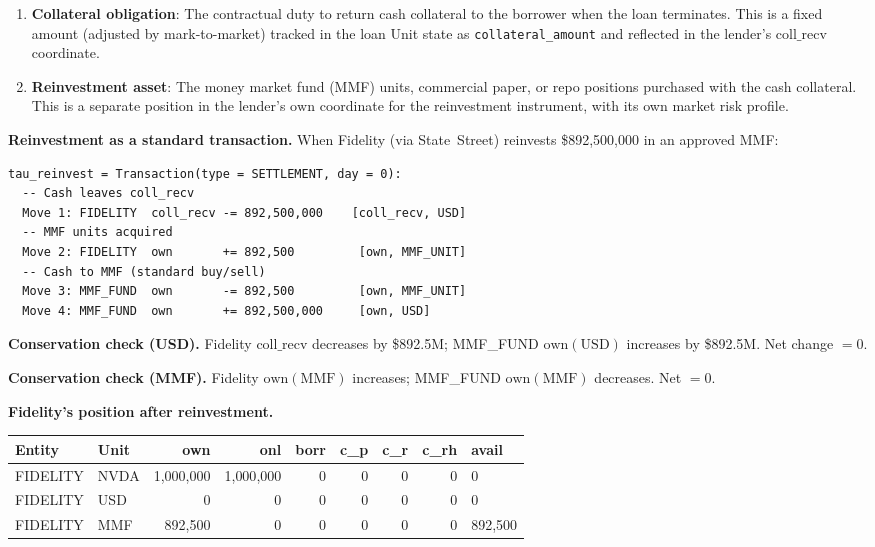\documentclass[11pt,a4paper]{article}
\begin{document}
\begin{enumerate}[nosep]
\item \textbf{Collateral obligation}: The contractual duty to return cash collateral to the borrower when the loan terminates. This is a fixed amount (adjusted by mark-to-market) tracked in the loan Unit state as \texttt{collateral\_amount} and reflected in the lender's $\mathrm{coll\_recv}$ coordinate.
\item \textbf{Reinvestment asset}: The money market fund (MMF) units, commercial paper, or repo positions purchased with the cash collateral. This is a separate position in the lender's $\mathrm{own}$ coordinate for the reinvestment instrument, with its own market risk profile.
\end{enumerate}

\noindent\textbf{Reinvestment as a standard transaction.} When Fidelity (via State~Street) reinvests \$892{,}500{,}000 in an approved MMF:

\begin{lstlisting}
tau_reinvest = Transaction(type = SETTLEMENT, day = 0):
  -- Cash leaves coll_recv
  Move 1: FIDELITY  coll_recv -= 892,500,000    [coll_recv, USD]
  -- MMF units acquired
  Move 2: FIDELITY  own       += 892,500         [own, MMF_UNIT]
  -- Cash to MMF (standard buy/sell)
  Move 3: MMF_FUND  own       -= 892,500         [own, MMF_UNIT]
  Move 4: MMF_FUND  own       += 892,500,000     [own, USD]
\end{lstlisting}

\noindent\textbf{Conservation check (USD).} Fidelity $\mathrm{coll\_recv}$ decreases by \$892.5M; MMF\_FUND $\mathrm{own}(\text{USD})$ increases by \$892.5M. Net change $= 0$. \checkmark

\noindent\textbf{Conservation check (MMF).} Fidelity $\mathrm{own}(\text{MMF})$ increases; MMF\_FUND $\mathrm{own}(\text{MMF})$ decreases. Net $= 0$. \checkmark

\medskip
\noindent\textbf{Fidelity's position after reinvestment.}

\begin{center}\small
\begin{tabular}{l l r r r r r r l}
\toprule
\textbf{Entity} & \textbf{Unit} & own & onl & borr & c\_p & c\_r & c\_rh & avail \\
\midrule
FIDELITY & NVDA & 1{,}000{,}000 & 1{,}000{,}000 & 0 & 0 & 0 & 0 & 0 \\
FIDELITY & USD & 0 & 0 & 0 & 0 & 0 & 0 & 0 \\
FIDELITY & MMF & 892{,}500 & 0 & 0 & 0 & 0 & 0 & 892{,}500 \\
\bottomrule
\end{tabular}
\end{center}
\end{document}
